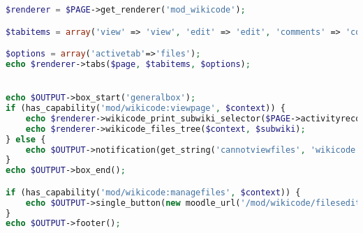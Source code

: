 \begin{lstlisting}[language=PHP]
$renderer = $PAGE->get_renderer('mod_wikicode');

$tabitems = array('view' => 'view', 'edit' => 'edit', 'comments' => 'comments', 'history' => 'history', 'map' => 'map', 'files' => 'files');

$options = array('activetab'=>'files');
echo $renderer->tabs($page, $tabitems, $options);


echo $OUTPUT->box_start('generalbox');
if (has_capability('mod/wikicode:viewpage', $context)) {
    echo $renderer->wikicode_print_subwiki_selector($PAGE->activityrecord, $subwiki, $page, 'files');
    echo $renderer->wikicode_files_tree($context, $subwiki);
} else {
    echo $OUTPUT->notification(get_string('cannotviewfiles', 'wikicode'));
}
echo $OUTPUT->box_end();

if (has_capability('mod/wikicode:managefiles', $context)) {
    echo $OUTPUT->single_button(new moodle_url('/mod/wikicode/filesedit.php', array('subwiki'=>$subwiki->id, 'pageid'=>$pageid)), get_string('editfiles', 'wikicode'), 'get');
}
echo $OUTPUT->footer();
\end{lstlisting}

